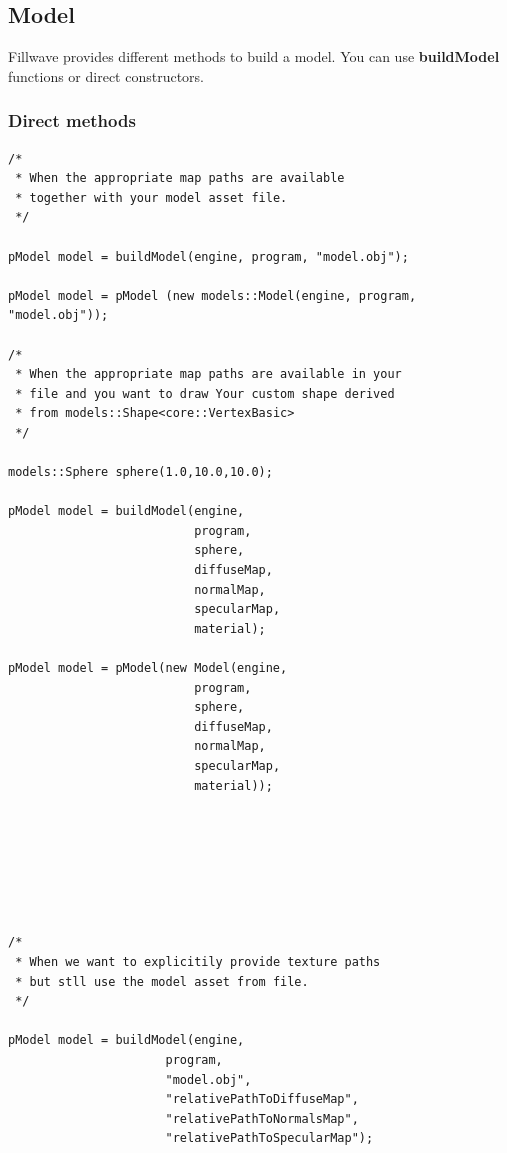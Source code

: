 \documentclass{article}
\begin{document}
\newpage

\subsection{Model}\label{sec:Model}
\indent \indent Fillwave provides different methods to build a model. You can use \textbf{buildModel} functions or direct constructors.

\subsubsection{Direct methods}\label{sec:directCreation}

\begin{lstlisting}
/* 
 * When the appropriate map paths are available
 * together with your model asset file.
 */

pModel model = buildModel(engine, program, "model.obj");

pModel model = pModel (new models::Model(engine, program, "model.obj"));

/*
 * When the appropriate map paths are available in your
 * file and you want to draw Your custom shape derived 
 * from models::Shape<core::VertexBasic> 
 */

models::Sphere sphere(1.0,10.0,10.0);

pModel model = buildModel(engine,
                          program,
                          sphere,
                          diffuseMap,
                          normalMap,
                          specularMap,
                          material);
                         
pModel model = pModel(new Model(engine,
                          program,
                          sphere,
                          diffuseMap,
                          normalMap,
                          specularMap,
                          material));
        
    
    
    
    
    
         
/* 
 * When we want to explicitily provide texture paths
 * but stll use the model asset from file.   
 */

pModel model = buildModel(engine,
                      program,
                      "model.obj",
                      "relativePathToDiffuseMap",
                      "relativePathToNormalsMap",
                      "relativePathToSpecularMap");
                      

\end{lstlisting}
\end{document}
